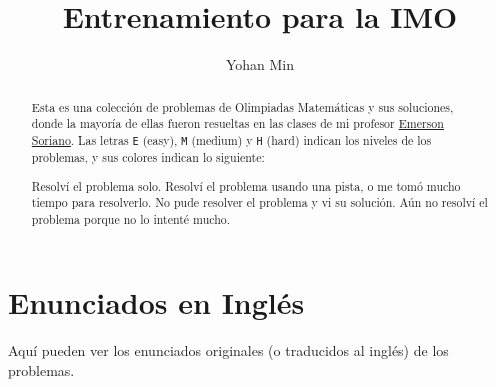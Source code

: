 \documentclass[11pt]{scrartcl}
\title{Entrenamiento para la IMO}
\author{Yohan Min}
\begin{document}
\maketitle

\begin{abstract}
	Esta es una colección de problemas de Olimpiadas Matemáticas y sus soluciones, donde la mayoría de ellas fueron resueltas en las clases de mi profesor \href{https://www.facebook.com/emerson.sorianoperez}{Emerson Soriano}. Las letras \verb|E| (easy), \verb|M| (medium) y \verb|H| (hard) indican los niveles de los problemas, y sus colores indican lo siguiente:
	\begin{description}[labelwidth=\widthof{\texttt{aaaaa}}+1.2em,leftmargin=\widthof{\texttt{aaaaa}a}+1.2em,align=right]
		 Resolví el problema solo.
		 Resolví el problema usando una pista, o me tomó mucho tiempo para resolverlo.
		 No pude resolver el problema y vi su solución.
		 Aún no resolví el problema porque no lo intenté mucho.
	\end{description}
\end{abstract}

\tableofcontents











%
%
%
%
%

\section{Enunciados en Inglés}

Aquí pueden ver los enunciados originales (o traducidos al inglés) de los problemas.

\makehints
\clearpage
\printbibliography
\end{document}
